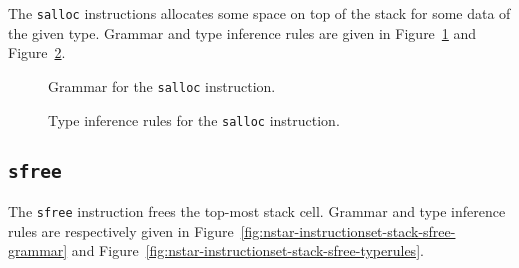 The \texttt{salloc} instructions allocates some space on top of the stack for some data of the given type.
Grammar and type inference rules are given in Figure~\ref{fig:nstar-instructionset-stack-salloc-grammar} and Figure~\ref{fig:nstar-instructionset-stack-salloc-typerules}.

\begin{figure}[H]
  \centering


  \caption{Grammar for the \texttt{salloc} instruction.}
  \label{fig:nstar-instructionset-stack-salloc-grammar}
\end{figure}

\begin{figure}[H]
  \centering


  \caption{Type inference rules for the \texttt{salloc} instruction.}
  \label{fig:nstar-instructionset-stack-salloc-typerules}
\end{figure}

\subsection{\texttt{sfree}}\label{subsec:nstar-instructionset-stack-sfree}

The \texttt{sfree} instruction frees the top-most stack cell.
Grammar and type inference rules are respectively given in Figure~\ref{fig:nstar-instructionset-stack-sfree-grammar} and Figure~\ref{fig:nstar-instructionset-stack-sfree-typerules}.

